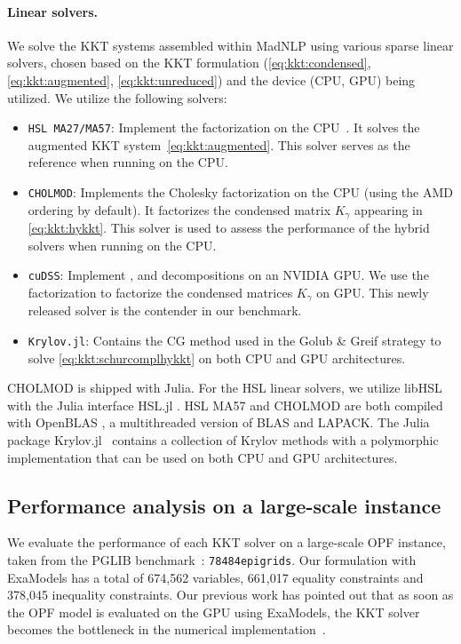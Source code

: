 \paragraph{Linear solvers.}
We solve the KKT systems assembled within MadNLP using various sparse linear solvers, chosen based on the KKT formulation (\ref{eq:kkt:condensed}, \ref{eq:kkt:augmented}, \ref{eq:kkt:unreduced}) and the device (CPU, GPU) being utilized. We utilize the following solvers:
\begin{itemize}
  \item {\tt HSL MA27/MA57}: Implement the \lblt factorization on the CPU~\cite{duff1983multifrontal}.
    It solves the augmented KKT system~\eqref{eq:kkt:augmented}.
    This solver serves as the reference when running on the CPU.
  \item {\tt CHOLMOD}: Implements the Cholesky factorization on the CPU %
    (using the AMD ordering \cite{amestoy-david-duff-2004} by default).
    It factorizes the condensed matrix $K_\gamma$ appearing in \eqref{eq:kkt:hykkt}.
    This solver is used to assess the performance of the hybrid solvers when running on the CPU.
  \item {\tt cuDSS}: Implement \llt, \ldlt and \lu decompositions on an NVIDIA GPU.
    We use the \ldlt factorization to factorize the condensed matrices $K_\gamma$ on GPU.
    This newly released solver is the contender in our benchmark.
  \item {\tt Krylov.jl}: Contains the CG method
    used in the Golub \& Greif strategy to solve \eqref{eq:kkt:schurcomplhykkt} on both CPU and GPU architectures.
\end{itemize}
CHOLMOD \cite{chen-davis-hager-rajamanickam-2008} is shipped with Julia.
For the HSL linear solvers, we utilize libHSL \cite{fowkes-lister-montoison-orban-2024} with the Julia interface HSL.jl \cite{montoison-orban-hsl-2021}.
HSL MA57 and CHOLMOD are both compiled with OpenBLAS \cite{openblas}, a multithreaded version of BLAS and LAPACK.
The Julia package Krylov.jl~\cite{montoison2023krylov} contains a collection of Krylov methods with a polymorphic implementation that can be used on both CPU and GPU architectures.

\subsection{Performance analysis on a large-scale instance}
\label{sec:num:pprof}
We evaluate the performance of each KKT solver on a large-scale OPF instance, taken from
the PGLIB benchmark~\cite{babaeinejadsarookolaee2019power}: {\tt 78484epigrids}.
Our formulation with ExaModels has
a total of 674,562 variables, 661,017 equality constraints and 378,045
inequality constraints.
Our previous work has pointed out that as soon as the OPF model is
evaluated on the GPU using ExaModels, the KKT solver becomes the bottleneck
in the numerical implementation~\cite{shin2023accelerating}.

